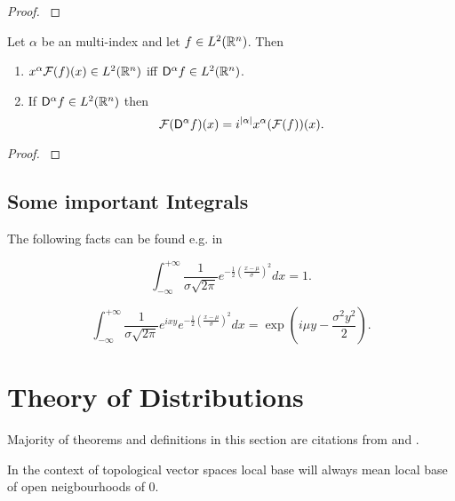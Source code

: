 \documentclass[main.tex]{subfiles}
\begin{document}
\begin{proof}
\cite[see][3.4]{miklavcic1998}
\end{proof}
\begin{theorem}
\label{fourier-weak-d}
Let $\alpha$ be an multi-index and let  $f\in L^2(\mathbb{R}^n)$. Then
\begin{enumerate}
\item $x^\alpha\mathcal{F}(f)(x) \in L^2(\mathbb{R}^n)$ iff $\mathsf{D}^\alpha f \in L^2(\mathbb{R}^n)$.
\item If $\mathsf{D}^\alpha f \in L^2(\mathbb{R}^n)$ then
\begin{equation}
 \mathcal{F}(\mathsf{D}^{\alpha}f)(x) = i^{|\alpha|}x^\alpha (\mathcal{F}(f))(x).
\end{equation} 
\end{enumerate}
\end{theorem}
\begin{proof}
\cite[see][3.4]{miklavcic1998}
\end{proof}

\subsection{Some important Integrals}

The following facts can be found e.g. in \cite{dudley2002}

\begin{fact}
\begin{equation}
\int^{+\infty}_{-\infty} \frac{1}{\sigma \sqrt{2\pi} } e^{-\frac{1}{2}\left(\frac{x-\mu}{\sigma}\right)^2}dx = 1.
\end{equation}
\end{fact}

\begin{fact}
\begin{equation}
\label{normal-characteristic}
\int^{+\infty}_{-\infty} \frac{1}{\sigma \sqrt{2\pi} } e^{ixy} e^{-\frac{1}{2}\left(\frac{x-\mu}{\sigma}\right)^2}dx = \exp(i\mu y - \frac{\sigma^2 y^2}{2}).
\end{equation}
\end{fact}

\section{Theory of Distributions}
Majority of theorems and definitions in this section are citations from \cite{rudin1991} and \cite{treves1970}.

In the context of topological vector spaces local base will always mean local base of open neigbourhoods of 0.
\end{document}
